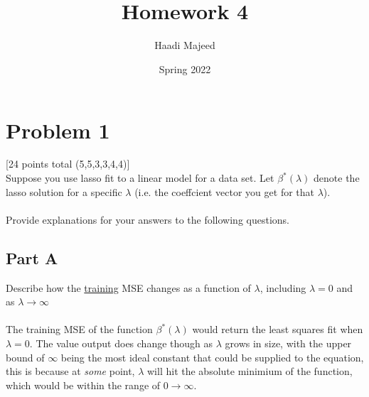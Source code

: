 \documentclass[12pt]{article}
\title{ \course \\\large Homework 4 }
\author{ Haadi Majeed }
\date{Spring 2022}
\begin{document}
\maketitle
\pagebreak

\pagebreak
\section{Problem 1}
 [24 points total (5,5,3,3,4,4)]\\
Suppose you use lasso fit to a linear model for a data set. Let $\beta^*(\lambda)$ denote the lasso solution for a specific $\lambda$ (i.e. the coeffcient vector you get for that $\lambda$).
\\\\Provide explanations for your answers to the following questions.

\subsection{Part A}
Describe how the \underline{training} MSE changes as a function of $\lambda$, including $\lambda = 0$ and as $\lambda \rightarrow \infty$\\\\
The training MSE of the function $\beta^*(\lambda)$ would return the least squares fit when $\lambda = 0$. The value output does change though as $\lambda$ grows in size, with the upper bound of $\infty$ being the most ideal constant that could be supplied to the equation, this is because at \emph{some} point, $\lambda$ will hit the absolute minimium of the function, which would be within the range of $0\rightarrow\infty$.
\end{document}
